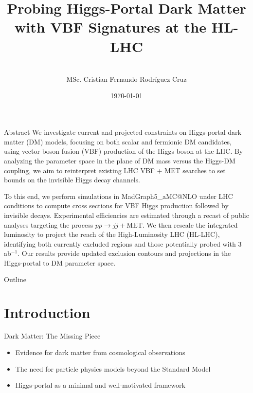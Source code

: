 \documentclass{../../bredelebeamer}
\title[Higgs-Portal DM with VBF at HL-LHC]{Probing Higgs-Portal Dark Matter with VBF Signatures at the HL-LHC}
\subtitle{}
\author[C. Rodríguez]{
	\vspace{2em}\\
	MSc. Cristian Fernando Rodríguez Cruz\inst{1}\\
	\vspace{1em}
}
\institute[Uniandes]{\inst{1} Universidad de los Andes\and
}
\date{\today}
\begin{document}
\begin{frame}
    \titlepage
\end{frame}
\begin{frame}{Abstract}
    \justifying
    We investigate current and projected constraints on Higgs-portal dark matter (DM) models, focusing on both scalar and fermionic DM candidates, using vector boson fusion (VBF) production of the Higgs boson at the LHC. By analyzing the parameter space in the plane of DM mass versus the Higgs-DM coupling, we aim to reinterpret existing LHC VBF + MET searches to set bounds on the invisible Higgs decay channels.

    \vfill

    To this end, we perform simulations in MadGraph5\_aMC@NLO under LHC conditions to compute cross sections for VBF Higgs production followed by invisible decays. Experimental efficiencies are estimated through a recast of public analyses targeting the process $pp \to jj + \text{MET}$. We then rescale the integrated luminosity to project the reach of the High-Luminosity LHC (HL-LHC), identifying both currently excluded regions and those potentially probed with 3 ab$^{-1}$. Our results provide updated exclusion contours and projections in the Higgs-portal to DM parameter space.
\end{frame}

\begin{frame}{Outline}
    \tableofcontents
\end{frame}

\section{Introduction}
\begin{frame}{Dark Matter: The Missing Piece}
    \begin{itemize}
        \item Evidence for dark matter from cosmological observations
        \item The need for particle physics models beyond the Standard Model
        \item Higgs-portal as a minimal and well-motivated framework
    \end{itemize}
\end{frame}
\end{document}
